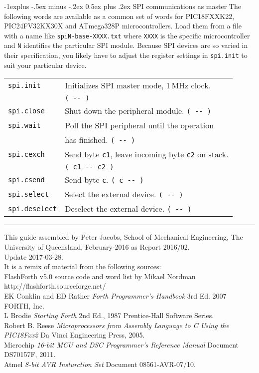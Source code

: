 \documentclass[10pt,landscape,a4paper]{article}
\makeatletter
\renewcommand{\subsection}{\@startsection{subsection}{2}{0mm}%
                                {-1explus -.5ex minus -.2ex}%
                                {0.5ex plus .2ex}%
                                {\normalfont\normalsize\bfseries}}
\makeatother
\begin{document}
\begin{multicols}{3}
\medskip

\subsection{SPI communications as master}
The following words are available as a common set of words for PIC18FXXK22, 
PIC24FV32KX30X and ATmega328P microcontrollers.
Load them from a file with a name like \verb!spiN-base-XXXX.txt! where \verb!XXXX!
is the specific microcontroller and \verb!N! identifies the particular SPI module.
Because SPI devices are so varied in their specification, you likely have to 
adjust the register settings in \verb!spi.init! to suit your particular device.
\begin{tabular}{@{}ll@{}}
\verb!spi.init!  & Initializes SPI master mode, 1\,MHz clock. \\
                 & \verb!( -- ) !\\
\verb!spi.close! & Shut down the peripheral module. \verb!( -- )! \\ 
\verb!spi.wait!  & Poll the SPI peripheral until the operation \\
                 & has finished. \verb!( -- )! \\
\verb!spi.cexch! & Send byte \verb!c1!, leave incoming byte \verb!c2! on stack. \\
                 & \verb!( c1 -- c2 )! \\
\verb!spi.csend! & Send byte \verb!c!. \verb!( c -- )! \\
\verb!spi.select! & Select the external device. \verb!( -- )! \\
\verb!spi.deselect! & Deselect the external device. \verb!( -- )! \\
\end{tabular}


\rule{0.3\linewidth}{0.25pt}
\scriptsize

This guide assembled by Peter Jacobs, School of Mechanical Engineering,
The University of Queensland, February-2016 as Report 2016/02. \\
Update 2017-03-28. \\
It is a remix of material from the following sources:\\
FlashForth v5.0 source code and word list by Mikael Nordman \\
http://flashforth.sourceforge.net/ \\
EK Conklin and ED Rather \textit{Forth Programmer's Handbook} 3rd Ed. 2007 FORTH, Inc.\\
L Brodie \textit{Starting Forth} 2nd Ed., 1987 Prentice-Hall Software Series.\\
Robert B. Reese \textit{Microprocessors from Assembly Language to C 
Using the PIC18Fxx2} Da Vinci Engineering Press, 2005.\\
Microchip \textit{16-bit MCU and DSC Programmer’s Reference Manual} Document DS70157F, 2011.\\
Atmel \textit{8-bit AVR Insturction Set} Document 08561-AVR-07/10.\\

\end{multicols}
\end{document}
